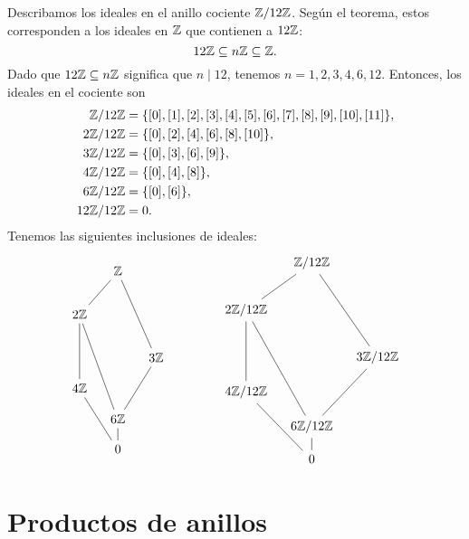 \begin{ejemplo}
  Describamos los ideales en el anillo cociente $\mathbb{Z}/12\mathbb{Z}$. Según el teorema,
  estos corresponden a los ideales en $\mathbb{Z}$ que contienen a $12\mathbb{Z}$:
  $$12\mathbb{Z} \subseteq n\mathbb{Z} \subseteq \mathbb{Z}.$$
  Dado que $12\mathbb{Z} \subseteq n\mathbb{Z}$ significa que $n \mid 12$, tenemos $n = 1,2,3,4,6,12$. Entonces, los ideales en el cociente son
  \begin{align*}
    \mathbb{Z}/12\mathbb{Z} & = \{ [0], [1], [2], [3], [4], [5], [6], [7], [8], [9], [10], [11] \},\\
    2\mathbb{Z}/12\mathbb{Z} & = \{ [0], [2], [4], [6], [8], [10] \},\\
    3\mathbb{Z}/12\mathbb{Z} & = \{ [0], [3], [6], [9] \},\\
    4\mathbb{Z}/12\mathbb{Z} & = \{ [0], [4], [8] \},\\
    6\mathbb{Z}/12\mathbb{Z} & = \{ [0], [6] \},\\
    12\mathbb{Z}/12\mathbb{Z} & = 0.
  \end{align*}
  Tenemos las siguientes inclusiones de ideales:
  \[ \begin{tikzcd}[row sep=1em, column sep=1em]
      & \ZZ\ar[-]{ddl}\ar[-]{ddddr} \\
      \\
      2\ZZ\ar[-]{ddd}\ar[-]{ddddr} \\
      \\
      & & 3\ZZ\ar[-]{ddl} \\
      4\ZZ\ar[-]{ddr} \\
      & 6\ZZ\ar[-]{d} \\
      & 0
    \end{tikzcd}
    \quad\quad\quad\quad
    \begin{tikzcd}[row sep=1em, column sep=1em]
      & \ZZ/12\ZZ\ar[-]{ddl}\ar[-]{ddddr} \\
      \\
      2\ZZ/12\ZZ\ar[-]{ddd}\ar[-]{ddddr} \\
      \\
      & & 3\ZZ/12\ZZ\ar[-]{ddl} \\
      4\ZZ/12\ZZ\ar[-]{ddr} \\
      & 6\ZZ/12\ZZ\ar[-]{d} \\
      & 0
    \end{tikzcd} \]
\end{ejemplo}


\section{Productos de anillos}

